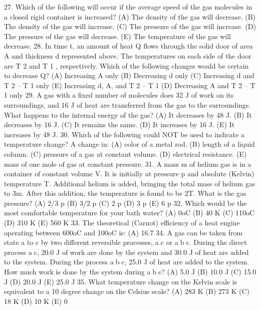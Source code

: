 27. Which of the following will occur if the average speed of the gas molecules in a closed rigid container is
increased?
(A) The density of the gas will decrease.
(B) The density of the gas will increase.
(C) The pressure of the gas will increase.
(D) The pressure of the gas will decrease.
(E) The temperature of the gas will decrease.
28. In time t, an amount of heat Q flows through the solid door of area A and thickness d represented above. The
temperatures on each side of the door are T 2 and T 1 , respectively. Which of the following changes would be
certain to decrease Q?
(A) Increasing A only (B) Decreasing d only (C) Increasing d and T 2 – T 1 only
(E) Increasing d, A, and T 2 – T 1
(D) Decreasing A and T 2 – T 1 only
29. A gas with a fixed number of molecules does 32 J of work on its surroundings, and 16 J of heat are transferred
from the gas to the surroundings. What happens to the internal energy of the gas?
(A) It decreases by 48 J. (B) It decreases by 16 J. (C) It remains the same. (D) It increases by 16 J.
(E) It increases by 48 J.
30. Which of the following could NOT be used to indicate a temperature change? A change in:
(A) color of a metal rod. (B) length of a liquid column. (C) pressure of a gas at constant volume.
(D) electrical resistance. (E) mass of one mole of gas at constant pressure.
31. A mass m of helium gas is in a container of constant volume V. It is initially at pressure p and absolute (Kelvin)
temperature T. Additional helium is added, bringing the total mass of helium gas to 3m. After this addition, the
temperature is found to be 2T. What is the gas pressure?
(A) 2/3 p (B) 3/2 p (C) 2 p (D) 3 p (E) 6 p
32. Which would be the most comfortable temperature for your bath water?
(A) 0oC (B) 40 K (C) 110oC (D) 310 K (E) 560 K
33. The theoretical (Carnot) efficiency of a heat engine operating between 600oC and 100oC is:
(A) 16.7%
34. A gas can be taken from state a to c by two different reversible processes, ac or abc. During the direct
process ac, 20.0 J of work are done by the system and 30.0 J of heat are added to the system. During the
process abc, 25.0 J of heat are added to the system. How much work is done by the system during abc?
(A) 5.0 J (B) 10.0 J (C) 15.0 J (D) 20.0 J (E) 25.0 J
35. What temperature change on the Kelvin scale is equivalent to a 10 degree change on the Celsius scale?
(A) 283 K (B) 273 K (C) 18 K (D) 10 K (E) 0



